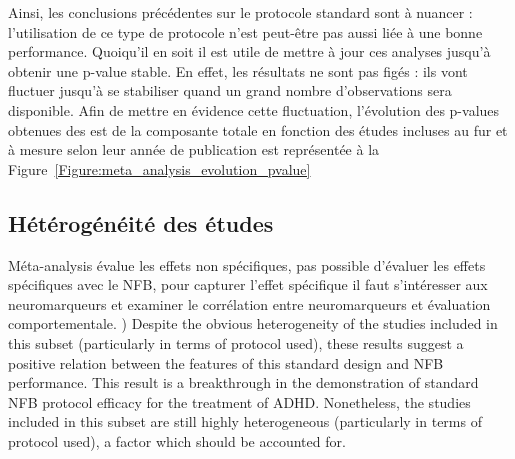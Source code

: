 Ainsi, les conclusions précédentes sur le protocole standard sont à nuancer : l'utilisation de ce type de protocole n'est peut-être pas aussi liée
à une bonne performance. Quoiqu'il en soit il est utile de mettre à jour ces analyses jusqu'à obtenir une p-value stable. En effet, les résultats ne sont 
pas figés : ils vont fluctuer jusqu'à se stabiliser quand un grand nombre d'observations sera disponible. Afin de mettre en évidence cette fluctuation, 
l'évolution des p-values obtenues des \gls{est} de la composante totale en fonction des études incluses au fur et à mesure selon leur année de publication 
est représentée à la Figure~\ref{Figure:meta_analysis_evolution_pvalue} 


\subsection{Hétérogénéité des études}

Méta-analysis évalue les effets non spécifiques, pas possible d'évaluer les effets spécifiques avec le NFB, pour capturer l'effet spécifique il faut s'intéresser
aux neuromarqueurs et examiner le corrélation entre neuromarqueurs et évaluation comportementale. )
Despite the obvious heterogeneity
of the studies included in this subset (particularly in terms of
protocol used), these results suggest a positive relation between
the features of this standard design and NFB performance. This
result is a breakthrough in the demonstration of standard NFB
protocol efficacy for the treatment of ADHD. Nonetheless, the
studies included in this subset are still highly heterogeneous
(particularly in terms of protocol used), a factor which should be
accounted for.